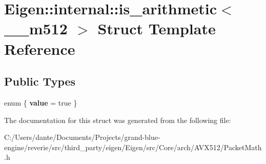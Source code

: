 \hypertarget{struct_eigen_1_1internal_1_1is__arithmetic_3_01____m512_01_4}{}\section{Eigen\+::internal\+::is\+\_\+arithmetic$<$ \+\_\+\+\_\+m512 $>$ Struct Template Reference}
\label{struct_eigen_1_1internal_1_1is__arithmetic_3_01____m512_01_4}
\subsection*{Public Types}
\begin{DoxyCompactItemize}
\item 
\mbox{\label{struct_eigen_1_1internal_1_1is__arithmetic_3_01____m512_01_4_ae6f7ff8a66952267406fe7372127ebf9}} 
enum \{ {\bfseries value} = true
 \}
\end{DoxyCompactItemize}


The documentation for this struct was generated from the following file\+:\begin{DoxyCompactItemize}
\item 
C\+:/\+Users/dante/\+Documents/\+Projects/grand-\/blue-\/engine/reverie/src/third\+\_\+party/eigen/\+Eigen/src/\+Core/arch/\+A\+V\+X512/Packet\+Math.\+h\end{DoxyCompactItemize}
